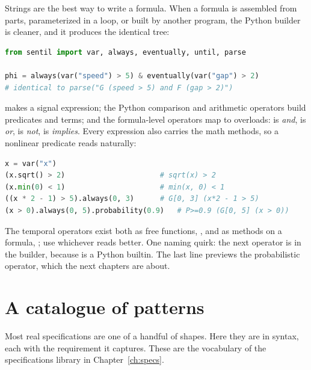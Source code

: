 Strings are the best way to write a formula. When a formula is assembled from parts, parameterized in a loop, or built by another program, the Python builder is cleaner, and it produces the identical tree:

\begin{lstlisting}[language=Python]
from sentil import var, always, eventually, until, parse

phi = always(var("speed") > 5) & eventually(var("gap") > 2)
# identical to parse("G (speed > 5) and F (gap > 2)")
\end{lstlisting}

 makes a signal expression; the Python comparison and arithmetic operators build predicates and terms; and the formula-level operators map to overloads: \code{\&} is \emph{and}, \code{|} is \emph{or}, \code{\textasciitilde} is \emph{not}, \code{>>} is \emph{implies}. Every expression also carries the math methods, so a nonlinear predicate reads naturally:

\begin{lstlisting}[language=Python]
x = var("x")
(x.sqrt() > 2)                      # sqrt(x) > 2
(x.min(0) < 1)                      # min(x, 0) < 1
((x * 2 - 1) > 5).always(0, 3)      # G[0, 3] (x*2 - 1 > 5)
(x > 0).always(0, 5).probability(0.9)   # P>=0.9 (G[0, 5] (x > 0))
\end{lstlisting}

The temporal operators exist both as free functions, , and as methods on a formula, ; use whichever reads better. One naming quirk: the next operator is  in the builder, because  is a Python builtin. The last line previews the probabilistic operator, which the next chapters are about.

\section{A catalogue of patterns}

Most real specifications are one of a handful of shapes. Here they are in \sentil{} syntax, each with the requirement it captures. These are the vocabulary of the specifications library in Chapter~\ref{ch:specs}.

